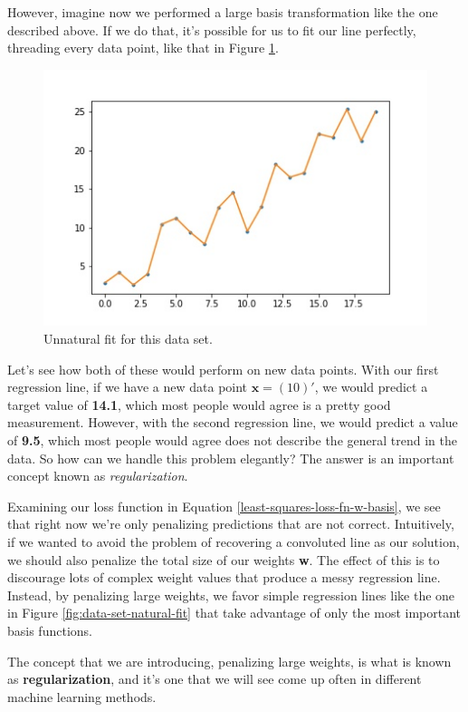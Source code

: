 However, imagine now we performed a large basis transformation like the one described above. If we do that, it's possible for us to fit our line perfectly, threading every data point, like that in Figure \ref{fig:data-set-unnatural-fit}.

\begin{figure}
    \centering
    \includegraphics[width=0.5\paperwidth]{../LinearRegression/fig/data_set_unnatural_fit_GEN.jpg}
    \caption{Unnatural fit for this data set.}
    \label{fig:data-set-unnatural-fit}
\end{figure}

Let's see how both of these would perform on new data points. With our first regression line, if we have a new data point $\textbf{x} = (10)'$, we would predict a target value of \textbf{14.1}, which most people would agree is a pretty good measurement. However, with the second regression line, we would predict a value of \textbf{9.5}, which most people would agree does not describe the general trend in the data. So how can we handle this problem elegantly? The answer is an important concept known as \textit{regularization}.

Examining our loss function in Equation \ref{least-squares-loss-fn-w-basis}, we see that right now we're only penalizing predictions that are not correct. Intuitively, if we wanted to avoid the problem of recovering a convoluted line as our solution, we should also penalize the total size of our weights \textbf{w}. The effect of this is to discourage lots of complex weight values that produce a messy regression line. Instead, by penalizing large weights, we favor simple regression lines like the one in Figure \ref{fig:data-set-natural-fit} that take advantage of only the most important basis functions.

The concept that we are introducing, penalizing large weights, is what is known as \textbf{regularization}, and it's one that we will see come up often in different machine learning methods.


